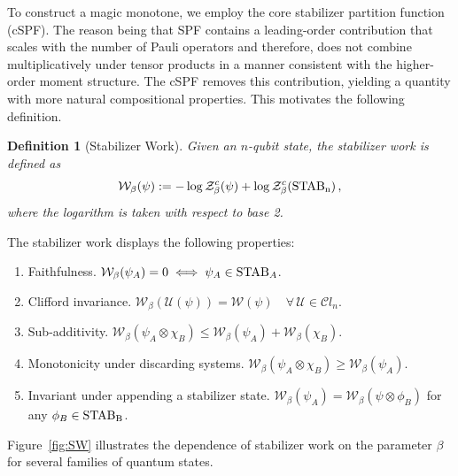 \documentclass[aps,pra,superscriptaddress,twocolumn,longbibliography]{revtex4-2}
\newtheorem{definition}{Definition}
\def\mC{\mathcal{C}}
\def\mU{\mathcal{U}}
\def\mW{\mathcal{W}}
\newcommand{\blue}[1]{\textcolor{blue}{#1}}
\begin{document}
To construct a magic monotone, we employ the core stabilizer partition function (cSPF). 
The reason being that SPF contains a leading-order contribution that scales with the number of Pauli operators and therefore, does not combine multiplicatively under tensor products in a manner consistent with the higher-order moment structure.
The cSPF removes this contribution, yielding a quantity with more natural compositional properties. This motivates the following definition.
%
\begin{definition}[Stabilizer Work]
Given an $n$-qubit state, the stabilizer work is defined as
\begin{equation}
    \mathcal{W}_{\beta}(\psi):=-\log \mathcal{Z}^c_{\beta}(\psi)+\log \mathcal{Z}^c_{\beta}({\rm STAB_{n}})\,,
\end{equation}
where the logarithm is taken with respect to base 2.
\end{definition}

The stabilizer work displays the following properties:
\begin{enumerate}
    \item Faithfulness. $\mathcal{W}_{\beta}(\psi_{A})=0 \iff \psi_A\in {\rm STAB}_A$. 
    \item Clifford invariance. $\mW_{\beta}(\mU(\psi))=\mW(\psi)\quad \forall \, \mU\in \mC l_n $.
    \item Sub-additivity. $\mathcal{W}_{\beta}(\psi_A \otimes \chi_B)\leq \mathcal{W}_{\beta}(\psi_{A}) + \mathcal{W}_{\beta}(\chi_{B})$. 
    \item Monotonicity under discarding systems. $\mW_{\beta}(\psi_A\otimes \chi_B)\geq \mW_{\beta}(\psi_A)$.
    \item Invariant under appending a stabilizer state. $\mW_{\beta}(\psi_A)=\mW_{\beta}(\psi\otimes \phi_B)$ for any $\phi_B\in {\rm STAB_B}$. 
\end{enumerate}
Figure~\ref{fig:SW} illustrates the dependence of stabilizer work on the parameter $\beta$ for several families of quantum states.
\end{document}
